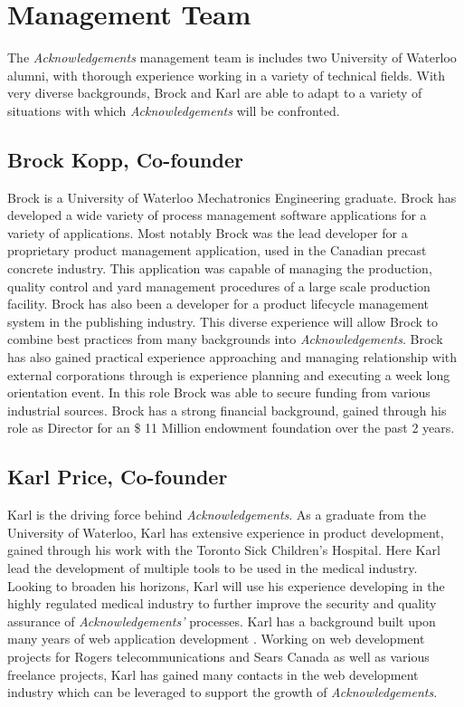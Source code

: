 \section{Management Team}

The {\it Acknowledgements}  management team is includes two University of Waterloo alumni, with thorough experience working in a variety of technical fields. With very diverse backgrounds, Brock and Karl are able to adapt to a variety of situations with which {\it Acknowledgements} will be confronted.

\subsection{Brock Kopp, Co-founder}
Brock is a University of Waterloo Mechatronics Engineering graduate. Brock has developed a wide variety of process management software applications for a variety of applications. Most notably Brock was the lead developer for a proprietary product management application, used in the Canadian precast concrete industry. This application was capable of managing the production, quality control and yard management procedures of a large scale production facility. Brock has also been a developer for a product lifecycle management system in the publishing industry. This diverse experience will allow Brock to combine best practices from many backgrounds into {\it Acknowledgements}. Brock has also gained practical experience approaching and managing relationship with external corporations through is experience planning and executing a week long orientation event. In this role Brock was able to secure funding from various industrial sources. Brock has a strong financial background, gained through his role as Director for an \$ 11 Million endowment foundation over the past 2 years.

\subsection{Karl Price, Co-founder}
Karl is the driving force behind {\it Acknowledgements}. As a graduate from the University of Waterloo, Karl has extensive experience in product development, gained through his work with the Toronto Sick Children's Hospital. Here Karl lead the development of multiple tools to be used in the medical industry. Looking to broaden his horizons, Karl will use his experience developing in the highly regulated medical industry to further improve the security and quality assurance of {\it Acknowledgements'} processes. Karl has a background built upon many years of web application development . Working on web development projects for Rogers telecommunications and Sears Canada as well as various freelance projects, Karl has gained many contacts in the web development industry which can be leveraged to support the growth of {\it Acknowledgements}.

